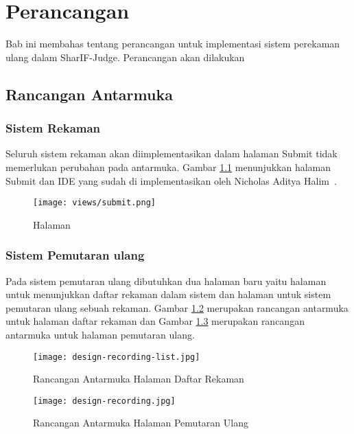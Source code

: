 \chapter{Perancangan}
\label{chap:perancangan}

Bab ini membahas tentang perancangan untuk implementasi sistem perekaman ulang dalam SharIF-Judge. Perancangan akan dilakukan 

\section{Rancangan Antarmuka}

\subsection{Sistem Rekaman}
\label{sub:4:1:rekaman}

Seluruh sistem rekaman akan diimplementasikan dalam halaman Submit tidak memerlukan perubahan pada antarmuka. Gambar \ref{fig:4:1:submit} menunjukkan halaman Submit dan IDE yang sudah di implementasikan oleh Nicholas Aditya Halim~\cite{nicholas:sharif}.

\begin{figure}[H]
    \centering
    \texttt{[image: views/submit.png]}
    \caption{Halaman}
    \label{fig:4:1:submit}
\end{figure}

\subsection{Sistem Pemutaran ulang}
\label{sub:4:1:pemutaranulang}

Pada sistem pemutaran ulang dibutuhkan dua halaman baru yaitu halaman untuk menunjukkan daftar rekaman dalam sistem dan halaman untuk sistem pemutaran ulang sebuah rekaman. Gambar \ref{fig:4:1:listrec} merupakan rancangan antarmuka untuk halaman daftar rekaman dan Gambar \ref{fig:4:1:rec} merupakan rancangan antarmuka untuk halaman pemutaran ulang.

\begin{figure}[H]
    \centering
    \texttt{[image: design-recording-list.jpg]}
    \caption{Rancangan Antarmuka Halaman Daftar Rekaman}
    \label{fig:4:1:listrec}
\end{figure}

\begin{figure}[H]
    \centering
    \texttt{[image: design-recording.jpg]}
    \caption{Rancangan Antarmuka Halaman Pemutaran Ulang}
    \label{fig:4:1:rec}
\end{figure}

